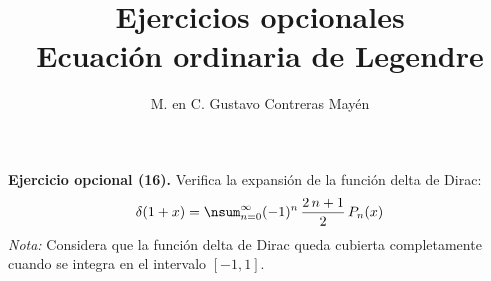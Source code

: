 
\title{Ejercicios opcionales \\[0.3em]  \large{Ecuación ordinaria de Legendre} \vspace{-3ex}}
\author{M. en C. Gustavo Contreras Mayén}
\date{ }


\vspace{-4cm}
\maketitle
\fontsize{14}{14}\selectfont


\noindent
\textbf{Ejercicio opcional (16).} Verifica la expansión de la función delta de Dirac:
\begin{align*}
\delta (1 + x) = \nsum_{n=0}^{\infty} (-1)^{n} \, \dfrac{2 \,n + 1}{2} \, P_{n} (x)
\end{align*}
\emph{Nota:} Considera que la función delta de Dirac queda cubierta completamente cuando se integra en el intervalo $[-1, 1]$.


